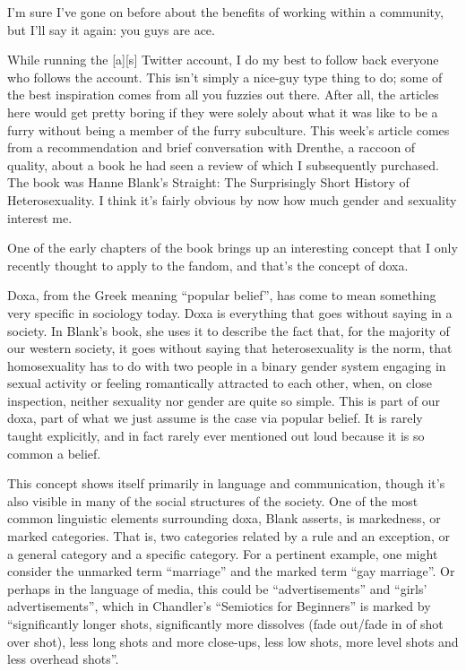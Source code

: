 
I'm sure I've gone on before about the benefits of working within a community, but I'll say it again: you guys are ace.

While running the {[}a{]}{[}s{]} Twitter account, I do my best to follow back everyone who follows the account. This isn't simply a nice-guy type thing to do; some of the best inspiration comes from all you fuzzies out there. After all, the articles here would get pretty boring if they were solely about what it was like to be a furry without being a member of the furry subculture. This week's article comes from a recommendation and brief conversation with Drenthe, a raccoon of quality, about a book he had seen a review of which I subsequently purchased. The book was Hanne Blank's Straight: The Surprisingly Short History of Heterosexuality. I think it's fairly obvious by now how much gender and sexuality interest me.

One of the early chapters of the book brings up an interesting concept that I only recently thought to apply to the fandom, and that's the concept of doxa.

Doxa, from the Greek meaning ``popular belief'', has come to mean something very specific in sociology today. Doxa is everything that goes without saying in a society. In Blank's book, she uses it to describe the fact that, for the majority of our western society, it goes without saying that heterosexuality is the norm, that homosexuality has to do with two people in a binary gender system engaging in sexual activity or feeling romantically attracted to each other, when, on close inspection, neither sexuality nor gender are quite so simple. This is part of our doxa, part of what we just assume is the case via popular belief. It is rarely taught explicitly, and in fact rarely ever mentioned out loud because it is so common a belief.

This concept shows itself primarily in language and communication, though it's also visible in many of the social structures of the society. One of the most common linguistic elements surrounding doxa, Blank asserts, is markedness, or marked categories. That is, two categories related by a rule and an exception, or a general category and a specific category. For a pertinent example, one might consider the unmarked term ``marriage'' and the marked term ``gay marriage''. Or perhaps in the language of media, this could be ``advertisements'' and ``girls' advertisements'', which in Chandler's ``Semiotics for Beginners'' is marked by ``significantly longer shots, significantly more dissolves (fade out/fade in of shot over shot), less long shots and more close-ups, less low shots, more level shots and less overhead shots''.

